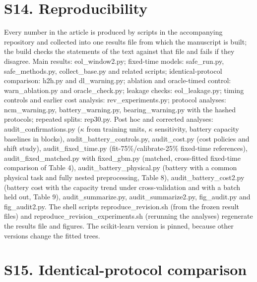 \documentclass[11pt,a4paper]{article}
\begin{document}
\section*{S14. Reproducibility}

\noindent Every number in the article is produced by scripts in the accompanying repository and collected into one results file from which the manuscript is built; the build checks the statements of the text against that file and fails if they disagree. Main results: eol\_window2.py; fixed-time models: safe\_run.py, safe\_methods.py, collect\_base.py and related scripts; identical-protocol comparison: h2h.py and dl\_warning.py; ablation and oracle-timed control: warn\_ablation.py and oracle\_check.py; leakage checks: eol\_leakage.py; timing controls and earlier cost analysis: rev\_experiments.py; protocol analyses: ncm\_warning.py, battery\_warning.py, bearing\_warning.py with the hashed protocols; repeated splits: rep30.py. Post hoc and corrected analyses: audit\_confirmations.py ($\kappa$ from training units, $\kappa$ sensitivity, battery capacity baselines in blocks), audit\_battery\_controls.py, audit\_cost.py (cost policies and shift study), audit\_fixed\_time.py (fit-75\%/calibrate-25\% fixed-time references), audit\_fixed\_matched.py with fixed\_gbm.py (matched, cross-fitted fixed-time comparison of Table 4), audit\_battery\_physical.py (battery with a common physical task and fully nested preprocessing, Table 8), audit\_battery\_cost2.py (battery cost with the capacity trend under cross-validation and with a batch held out, Table 9), audit\_summarize.py, audit\_summarize2.py, fig\_audit.py and fig\_audit2.py. The shell scripts reproduce\_revision.sh (from the frozen result files) and reproduce\_revision\_experiments.sh (rerunning the analyses) regenerate the results file and figures. The scikit-learn version is pinned, because other versions change the fitted trees.

\section*{S15. Identical-protocol comparison}
\end{document}
